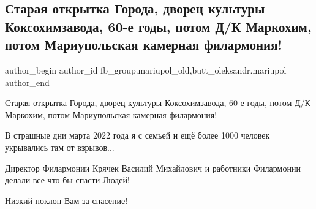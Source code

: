  
 
 
 
 

\subsection{Старая открытка Города, дворец культуры Коксохимзавода, 60-е годы, потом Д/К Маркохим, потом Мариупольская камерная филармония!}
\label{sec:02_04_2023.fb.fb_group.mariupol_old.1.staraya_otkritka_gor}
 
\ifcmt
 author_begin
   author_id fb_group.mariupol_old,butt_oleksandr.mariupol
 author_end
\fi

Старая открытка Города, дворец культуры Коксохимзавода, 60 е годы, потом Д/К
Маркохим, потом Мариупольская камерная филармония! 💐🥰

В страшные дни марта 2022 года я с семьей и ещё более 1000 человек укрывались
там от взрывов... 🥲

Директор Филармонии Крячек Василий Михайлович и работники Филармонии делали все
что бы спасти Людей! 💐🥰

Низкий поклон Вам за спасение!💐💐💐💐💐💐💐

